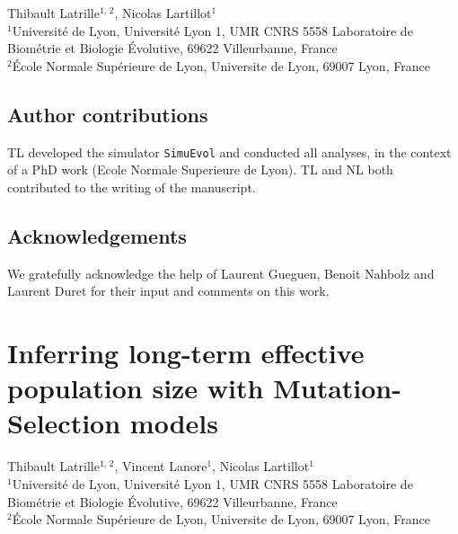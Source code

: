 \documentclass[a4paper,oneside,nobind]{thesis}
\begin{document}
    \begin{center}
        \Large Thibault Latrille$^{\text{1, 2}}$, Nicolas Lartillot$^{\text{1}}$\\
        \vspace{0.5cm}
        \normalsize
        $^{\text{1}}$Université de Lyon, Université Lyon 1, UMR CNRS 5558 Laboratoire de Biométrie et Biologie Évolutive, 69622 Villeurbanne, France\\
        $^{\text{2}}$École Normale Supérieure de Lyon, Universite de Lyon, 69007 Lyon, France\\
    \end{center}

    {\hypersetup{linkcolor=GREYDARK}\minitoc}
    


    \section{Author contributions}
    TL developed the simulator \texttt{SimuEvol} and conducted all analyses, in the context of a PhD work (Ecole Normale Superieure de Lyon).
    TL and NL both contributed to the writing of the manuscript.


    \section{Acknowledgements}
    We gratefully acknowledge the help of Laurent Gueguen, Benoit Nahbolz and Laurent Duret for their input and comments on this work.

    \thispagestyle{empty}
    \chapter{Inferring long-term effective population size with Mutation-Selection models}
    \label{chap:MutSelDrift}

    \begin{center}
        \Large Thibault Latrille$^{\text{1, 2}}$, Vincent Lanore$^{\text{1}}$, Nicolas Lartillot$^{\text{1}}$\\
        \vspace{0.5cm}
        \normalsize
        $^{\text{1}}$Université de Lyon, Université Lyon 1, UMR CNRS 5558 Laboratoire de Biométrie et Biologie Évolutive, 69622 Villeurbanne, France\\
        $^{\text{2}}$École Normale Supérieure de Lyon, Universite de Lyon, 69007 Lyon, France\\
    \end{center}
\end{document}

